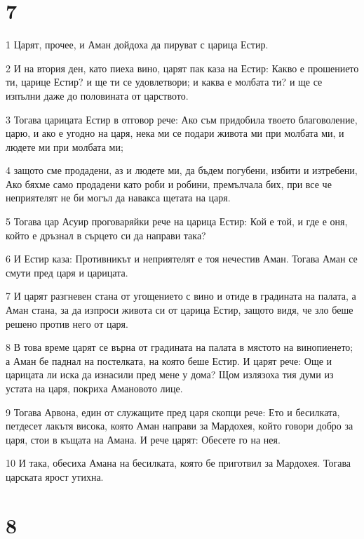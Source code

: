 \chapter{7}

\par 1 Царят, прочее, и Аман дойдоха да пируват с царица Естир.
\par 2 И на втория ден, като пиеха вино, царят пак каза на Естир: Какво е прошението ти, царице Естир? и ще ти се удовлетвори; и каква е молбата ти? и ще се изпълни даже до половината от царството.
\par 3 Тогава царицата Естир в отговор рече: Ако съм придобила твоето благоволение, царю, и ако е угодно на царя, нека ми се подари живота ми при молбата ми, и людете ми при молбата ми;
\par 4 защото сме продадени, аз и людете ми, да бъдем погубени, избити и изтребени, Ако бяхме само продадени като роби и робини, премълчала бих, при все че неприятелят не би могъл да навакса щетата на царя.
\par 5 Тогава цар Асуир проговаряйки рече на царица Естир: Кой е той, и где е оня, който е дръзнал в сърцето си да направи така?
\par 6 И Естир каза: Противникът и неприятелят е тоя нечестив Аман. Тогава Аман се смути пред царя и царицата.
\par 7 И царят разгневен стана от угощението с вино и отиде в градината на палата, а Аман стана, за да изпроси живота си от царица Естир, защото видя, че зло беше решено против него от царя.
\par 8 В това време царят се върна от градината на палата в мястото на винопиенето; а Аман бе паднал на постелката, на която беше Естир. И царят рече: Още и царицата ли иска да изнасили пред мене у дома? Щом излязоха тия думи из устата на царя, покриха Амановото лице.
\par 9 Тогава Арвона, един от служащите пред царя скопци рече: Ето и бесилката, петдесет лакътя висока, която Аман направи за Мардохея, който говори добро за царя, стои в къщата на Амана. И рече царят: Обесете го на нея.
\par 10 И така, обесиха Амана на бесилката, която бе приготвил за Мардохея. Тогава царската ярост утихна.

\chapter{8}

